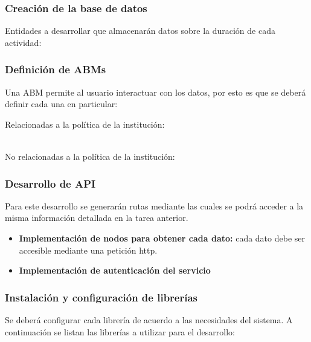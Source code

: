 \documentclass{article}
\begin{document}
\subsubsection{Creación de la base de datos}
\label{ssub:creacioDB}

Entidades a desarrollar que almacenarán datos  sobre la duración de cada actividad:

\begin{itemize}
    
\end{itemize}

\subsubsection{Definición de ABMs}%
\label{ssub:definición_de_abms}


Una ABM permite al usuario interactuar con los datos, por esto es que se deberá definir cada una en particular:\newline

Relacionadas a la política de la institución:
\begin{itemize}
    
\end{itemize}
\ \\No relacionadas a la política de la institución:
\begin{itemize}
    
\end{itemize}

\subsubsection{Desarrollo de API }%
\label{ssub:desarrollo_de_api_}
Para este desarrollo se generarán rutas mediante las cuales se podrá acceder a la misma información detallada en la tarea anterior.

\begin{itemize}
    \item \textbf{Implementación de nodos para obtener cada dato:} cada dato debe ser accesible mediante una petición http.
    \item \textbf{Implementación de autenticación del servicio}
\end{itemize}

\subsubsection{Instalación y configuración de librerías}%
\label{ssub:instalación_y_configuración_de_librerias}
Se deberá configurar cada librería de acuerdo a las necesidades del sistema.
A continuación se listan las librerías a utilizar para el desarrollo:
\end{document}
